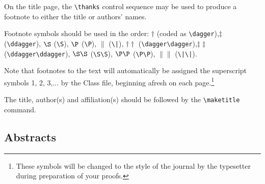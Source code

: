 \documentclass[]{cJEN2e}
\begin{document}
On the title page, the \verb"\thanks" control sequence may be used to produce a footnote to either the title or authors' names.

\vspace{6pt}Footnote symbols should be used in the order: $\dagger$
(coded as \verb"\dagger"),\break $\ddagger$ (\verb"\ddagger"), $\S$ (\verb"\S"),
$\P$ (\verb"\P"), $\|$ (\verb"\|"), $\dagger\dagger$
(\verb"\dagger\dagger"),\break $\ddagger\ddagger$
(\verb"\ddagger\ddagger"),  $\S\S$ (\verb"\S\S"), $\P\P$ (\verb"\P\P"),
$\|\|$ (\verb"\|\|").

Note that footnotes to the text will automatically be assigned the superscript
 symbols 1, 2, 3,... by the Class file, beginning afresh on each
page.\footnote{These symbols will be changed to the style of the journal by the
 typesetter during preparation of your proofs.}

The title, author(s) and affiliation(s) should be followed by the {\verb"\maketitle"} command.

\subsection{Abstracts}
\end{document}
